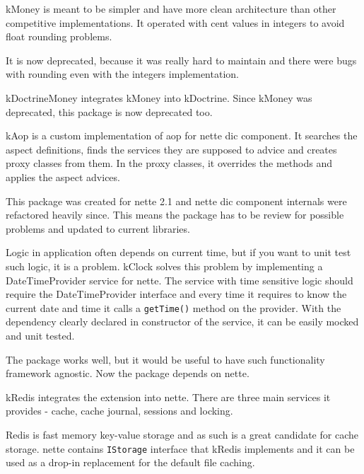 \gls{kMoney} is meant to be simpler and have more clean architecture than other competitive implementations. It operated with cent values in integers to avoid float rounding problems.

It is now deprecated, because it was really hard to maintain and there were bugs with rounding even with the integers implementation.

 \label{sec:state:doctrine-money}

\gls{kDoctrineMoney} integrates \gls{kMoney} into \gls{kDoctrine}. Since \gls{kMoney} was deprecated, this package is now deprecated too.

 \label{sec:state:aop}

\gls{kAop} is a custom implementation of \gls{aop} for \gls{nette} \gls{dic} component. It searches the aspect definitions, finds the services they are supposed to advice and creates proxy classes from them. In the proxy classes, it overrides the methods and applies the aspect advices.

This package was created for \gls{nette} 2.1 and \gls{nette} \gls{dic} component internals were refactored heavily since. This means the package has to be review for possible problems and updated to current libraries.

 \label{sec:state:clock}

Logic in application often depends on current time, but if you want to unit test such logic, it is a problem. \gls{kClock} solves this problem by implementing a DateTimeProvider service for \gls{nette}. The service with time sensitive logic should require the DateTimeProvider interface and every time it requires to know the current date and time it calls a \lstinline{getTime()} method on the provider. With the dependency clearly declared in constructor of the service, it can be easily mocked and unit tested.

The package works well, but it would be useful to have such functionality framework agnostic. Now the package depends on \gls{nette}.

 \label{sec:state:redis}

\gls{kRedis} integrates the  extension  into \gls{nette}. There are three main services it provides - cache, cache journal, sessions and locking.

Redis is fast memory key-value storage and as such is a great candidate for cache storage. \gls{nette} contains \lstinline{IStorage} interface that \gls{kRedis} implements and it can be used as a drop-in replacement for the default file caching.

